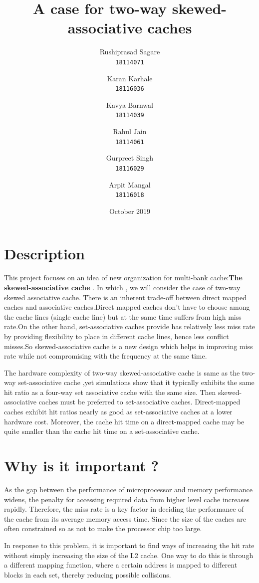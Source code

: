\documentclass{article}
\title{\Huge A case for two-way skewed-associative caches}
\author{Rushiprasad Sagare\\
  \texttt{18114071}
  \and
  Karan Karhale\\
  \texttt{18116036}
  \and
  Kavya Barnwal\\
  \texttt{18114039}
  \and
  Rahul Jain\\
  \texttt{18114061}
    \and
    Gurpreet Singh\\
    \texttt{18116029}
    \and
    Arpit Mangal\\
    \texttt{18116018}
  }
\date{October 2019}
\begin{document}
\maketitle

\section{Description}
\qquad This project focuses on an idea of new organization for multi-bank
cache:\textbf{The skewed-associative cache} . In which , we will consider the
case of two-way skewed associative cache. There is an inherent trade-off between direct mapped caches and
associative caches.\newline Direct mapped caches don’t have to choose among the
cache lines (single cache line) but at the same time suffers from high
miss rate.On the other hand, set-associative caches provide has
relatively less miss rate by providing flexibility to place in
different cache lines, hence less conflict misses.So skewed-associative
cache is a new design which helps in improving miss rate while not
compromising with the frequency at the same time.

\qquad The hardware complexity of two-way skewed-associative cache is same as
the two-way set-associative cache ,yet simulations show that it
typically exhibits the same hit ratio as a four-way set associative
cache with the same size. Then skewed-associative caches must be
preferred to set-associative caches. Direct-mapped caches exhibit hit
ratios nearly as good as set-associative caches at a lower hardware
cost. Moreover, the cache hit time on a direct-mapped cache may be
quite smaller than the cache hit time on a set-associative cache.

\section{Why is it important ?}
\qquad As the gap between the performance of microprocessor and memory
performance widens, the penalty for accessing required data from higher
level cache increases rapidly. Therefore, the miss rate is a key factor
in deciding the performance of the cache from its average memory access
time. Since the size of the caches are often constrained so as not to
make the processor chip too large.

\qquad In response to this problem, it is important to find ways of
increasing the hit rate without simply increasing the size of the L2
cache. One way to do this is through a different mapping function,
where a certain address is mapped to different blocks in each set,
thereby reducing possible collisions.
\newpage
\end{document}
